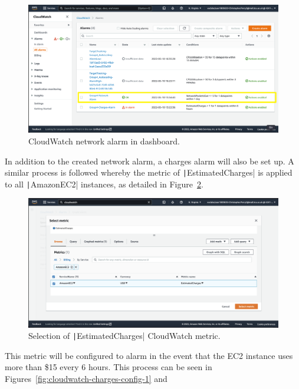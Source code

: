 \begin{figure}[!htbp]
    \centering
    \includegraphics[width=\textwidth]{resources/cloudwatch/cloudwatch-network-alarm-complete}
    \caption{CloudWatch network alarm in dashboard.}
    \label{fig:cloudwatch-network-alarm}
\end{figure}

In addition to the created network alarm, a charges alarm will also be set up.
A similar process is followed whereby the metric of \texttt|EstimatedCharges| is applied to all
\texttt|AmazonEC2| instances, as detailed in Figure~\ref{fig:cloudwatch-metric-charges}.

\begin{figure}[!htbp]
    \centering
    \includegraphics[width=\textwidth]{resources/cloudwatch/cloudwatch-metric-charges}
    \caption{Selection of \texttt|EstimatedCharges| CloudWatch metric.}
    \label{fig:cloudwatch-metric-charges}
\end{figure}

This metric will be configured to alarm in the event that the EC2 instance uses more than \$15 every 6 hours.
This process can be seen in Figures~\ref{fig:cloudwatch-charges-config-1} and 


